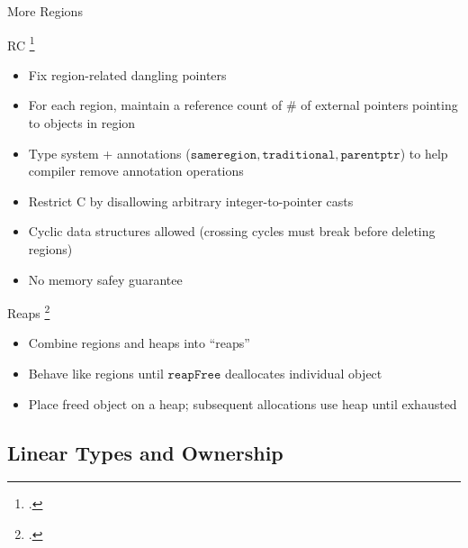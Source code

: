 \documentclass[aspectratio=169]{beamer}
\begin{document}
\begin{frame}{More Regions}
    \footnotesize{
RC \footcite{gay_language_2001}
    \vspace{-0.1in}
   \begin{itemize}
     \item Fix region-related dangling pointers %
     \item For each region, maintain a reference count of \# of external pointers pointing to objects in region %
     \item Type system + annotations ($\texttt{sameregion}, \texttt{traditional}, \texttt{parentptr}$) to help compiler remove annotation operations %
     \item Restrict C by disallowing arbitrary integer-to-pointer casts
     \item Cyclic data structures allowed (crossing cycles must break before deleting regions)
     \item No memory safey guarantee
   \end{itemize}
Reaps \footcite{berger_reconsidering_2002}
    \vspace{-0.1in}
   \begin{itemize}
     \item Combine regions and heaps into ``reaps''
     \item Behave like regions until $\texttt{reapFree}$ deallocates individual object
     \item Place freed object on a heap; subsequent allocations use heap until exhausted
   \end{itemize}
}
    \vspace{0.2in}
\end{frame}


\subsection{Linear Types and Ownership}
\end{document}
